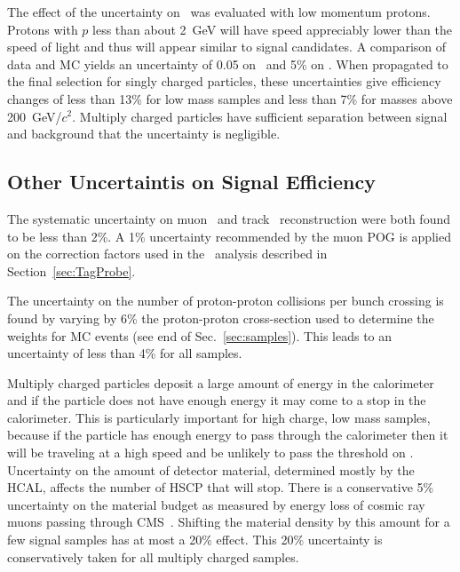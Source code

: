 The effect of the uncertainty on \dedx\ was evaluated with low momentum protons. Protons with $p$ less than  about 2~GeV will have speed appreciably lower than the
speed of light and thus will appear similar to signal candidates. A comparison of data and MC yields an uncertainty of 0.05 on \ias\ and 5\% on \ih. %
When propagated to the final selection for singly charged particles, these uncertainties give efficiency changes of less than 13\% for low mass samples
and less than 7\% for masses above 200~GeV/$c^2$. Multiply charged particles have sufficient
separation between signal and background that the uncertainty is negligible.


\subsection{Other Uncertaintis on Signal Efficiency}

The systematic uncertainty on muon~\cite{2012JInst...7P0002T} and track~\cite{CMS-PAS-TRK-10-002} reconstruction were both found to be less than 2\%.
A 1\% uncertainty recommended by the muon POG is applied on the correction factors used in the \muononly\ analysis described in Section~\ref{sec:TagProbe}.

The uncertainty on the number of proton-proton collisions per bunch crossing is found by varying by 6\% the 
proton-proton cross-section used to determine the weights for MC events (see end of Sec.~\ref{sec:samples}).
This leads to an uncertainty of less than 4\% for all samples.

Multiply charged particles deposit a large amount of energy in the calorimeter and if the particle does not have enough energy it may come to a stop in the calorimeter.
This is particularly important for high charge, low mass samples, because if the particle has enough energy to pass through the calorimeter then it will
be traveling at a high speed and be unlikely to pass the threshold on \invbeta. Uncertainty on the amount of detector material, determined mostly by the
HCAL, affects the number of HSCP that will stop. There is a conservative 5\% uncertainty on the material budget as measured by energy loss of cosmic ray muons
passing through CMS~\cite{2010JInst...5T3021C}. Shifting the material density by this amount for a few signal samples has at most a 20\% effect. This 20\% uncertainty is
conservatively taken for all multiply charged samples.

